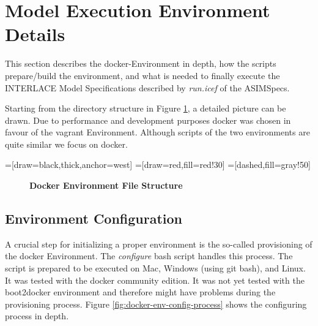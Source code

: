 \section{Model Execution Environment Details}
\label{sec:exec-env-model-details}

This section describes the docker-Environment in depth, how the scripts prepare/build the environment, and what is needed to finally execute the INTERLACE Model Specifications described by \textit{run.icef} of the ASIMSpecs.

Starting from the directory structure in Figure \ref{fig:docker-env-file-struct}, a detailed picture can be drawn. Due to performance and  development purposes docker was chosen in favour of the vagrant Environment. Although scripts of the two environments are quite similar we focus on docker.

=[draw=black,thick,anchor=west]
=[draw=red,fill=red!30]
=[dashed,fill=gray!50]
\begin{figure}[htbp]
\centering
{}
\caption{\bf\small Docker Environment File Structure}
\label{fig:docker-env-file-struct}
\end{figure}

\subsection{Environment Configuration}
A crucial step for initializing a proper environment is the so-called provisioning of the docker Environment. The \textit{configure} bash script handles this process. The script is prepared to be executed on Mac, Windows (using git bash), and Linux. It was tested with the docker community edition. It was not yet tested with the boot2docker environment and therefore might have problems during the provisioning process. Figure \ref{fig:docker-env-config-process} shows the configuring process in depth.

